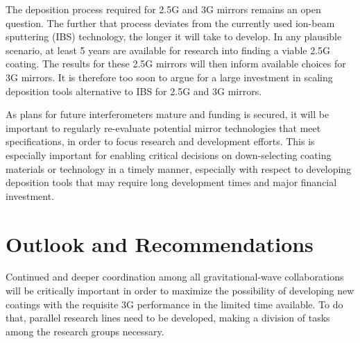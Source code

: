 The deposition process required for 2.5G and 3G mirrors remains an open question. The further that process deviates from the currently used ion-beam sputtering (IBS) technology, the longer it will take to develop. In any plausible scenario, at least 5 years are available for research into finding a viable 2.5G coating. The results for these 2.5G mirrors will then inform available choices for 3G mirrors. It is therefore too soon to argue for a large investment in scaling deposition tools alternative to IBS for 2.5G and 3G mirrors.

As plans for future interferometers mature and funding is secured, it will be important to regularly re-evaluate potential mirror technologies that meet specifications, in order to focus research and development efforts. This is especially important for enabling critical decisions on down-selecting coating materials or technology in a timely manner, especially with respect to developing deposition tools that may require long development times and major financial investment.



\section{Outlook and Recommendations}
\label{coatings_Recomm}

Continued and deeper coordination among all gravitational-wave collaborations will be critically important in order to maximize the possibility of developing new coatings with the requisite 3G performance in the limited time available. To do that, parallel research lines need to be developed, making a division of tasks among the research groups necessary.


